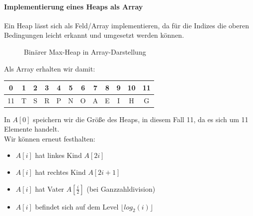 \documentclass[11pt,a4paper]{scrartcl}
\begin{document}
\paragraph{Implementierung eines Heaps als Array}
Ein Heap lässt sich als Feld/Array implementieren, da für die Indizes die oberen Bedingungen leicht erkannt und umgesetzt werden können. 
\begin{figure}
\centering
{}
\caption{Binärer Max-Heap in Array-Darstellung}
\end{figure}
Als Array erhalten wir damit:
\begin{table}[h]
\begin{tabular}{cccccccccccc}
0 & 1 & 2 & 3 & 4 & 5 & 6 & 7 & 8 & 9 & 10 & 11 \\
\hline
11 & T & S & R & P & N & O & A & E & I & H & G \\
\end{tabular}
\end{table}
In $A[0]$ speichern wir die Größe des Heaps, in diesem Fall 11, da es sich um 11 Elemente handelt. \\
Wir können erneut festhalten: 
\begin{itemize}
\item $A[i]$ hat linkes Kind $A[2i]$
\item $A[i]$ hat rechtes Kind $A[2i+1]$
\item $A[i]$ hat Vater $A[\frac{i}{2}]$ (bei Ganzzahldivision)
\item $A[i]$ befindet sich auf dem Level $\lfloor log_{2}(i) \rfloor$
\end{itemize}
\end{document}
